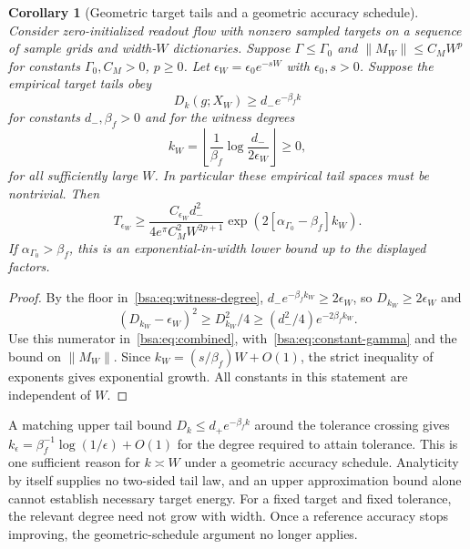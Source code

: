 \documentclass[11pt,letterpaper]{article}
\newcommand{\bsaNorm}[1]{\left\lVert #1\right\rVert}
\newtheorem{bsaCorollary}{Corollary}[section]
\theoremstyle{remark}
\theoremstyle{plain}
\begin{document}
\begin{bsaCorollary}[Geometric target tails and a geometric accuracy schedule]
\label{bsa:cor:width-time}
Consider zero-initialized readout flow with nonzero sampled targets on a sequence of sample grids and width-$W$ dictionaries. Suppose $\Gamma\le\Gamma_0$ and $\bsaNorm{M_W}\le C_MW^p$ for constants $\Gamma_0,C_M>0$, $p\ge0$. Let $\epsilon_W=\epsilon_0e^{-sW}$ with $\epsilon_0,s>0$. Suppose the empirical target tails obey
\begin{equation}
 D_k(g;X_W)\ge d_-e^{-\beta_f k}
 \label{bsa:eq:target-lower-assumption}
\end{equation}
for constants $d_-,\beta_f>0$ and for the witness degrees
\begin{equation}
 k_W=\left\lfloor\frac1{\beta_f}\log\frac{d_-}{2\epsilon_W}\right\rfloor\ge0,
 \label{bsa:eq:witness-degree}
\end{equation}
for all sufficiently large $W$. In particular these empirical tail spaces must be nontrivial. Then
\begin{equation}
 T_{\epsilon_W}\ge
 \frac{C_{\epsilon_W}d_-^2}{4e^\pi C_M^2W^{2p+1}}
 \exp\!\left(2[\alpha_{\Gamma_0}-\beta_f]k_W\right).
 \label{bsa:eq:width-time}
\end{equation}
If $\alpha_{\Gamma_0}>\beta_f$, this is an exponential-in-width lower bound up to the displayed factors.
\end{bsaCorollary}
\begin{proof}
By the floor in~\eqref{bsa:eq:witness-degree},
$d_-e^{-\beta_fk_W}\ge2\epsilon_W$, so $D_{k_W}\ge2\epsilon_W$ and
\[
 (D_{k_W}-\epsilon_W)^2\ge D_{k_W}^2/4
 \ge(d_-^2/4)e^{-2\beta_fk_W}.
\]
Use this numerator in~\eqref{bsa:eq:combined}, with~\eqref{bsa:eq:constant-gamma} and the bound on $\bsaNorm{M_W}$. Since $k_W=(s/\beta_f)W+O(1)$, the strict inequality of exponents gives exponential growth. All constants in this statement are independent of $W$.
\end{proof}

A matching upper tail bound $D_k\le d_+e^{-\beta_fk}$ around the tolerance crossing gives
$k_\epsilon=\beta_f^{-1}\log(1/\epsilon)+O(1)$ for the degree required to attain tolerance. This is one sufficient reason for $k\asymp W$ under a geometric accuracy schedule. Analyticity by itself supplies no two-sided tail law, and an upper approximation bound alone cannot establish necessary target energy. For a fixed target and fixed tolerance, the relevant degree need not grow with width. Once a reference accuracy stops improving, the geometric-schedule argument no longer applies.
\end{document}
